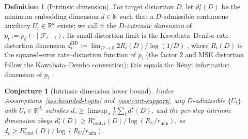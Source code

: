 \documentclass[11pt]{article}
\newcommand{\R}{\mathbb{R}}
\newcommand{\N}{\mathbb{N}}
\newcommand{\F}{\mathcal{F}}
\theoremstyle{plain}
\newtheorem{conjecture}[theorem]{Conjecture}
\theoremstyle{definition}
\newtheorem{definition}[theorem]{Definition}
\theoremstyle{remark}
\begin{document}
\begin{definition}[Intrinsic dimension]\label{def:intrinsic-dim}
For target distortion $D$, let $d^\star_t(D)$ be the minimum
embedding dimension $d \in \N$ such that a $D$-admissible
continuous auxiliary $U_t \in \R^d$ exists; we call it the
\emph{$D$-intrinsic dimension} of $p_t := p_\theta(\cdot \mid
\F_{t-1})$. Its small-distortion limit is the Kawabata--Dembo
rate-distortion dimension
$d^{\mathrm{RD}}_t := \lim_{D \to 0} 2 R_t(D)/\log(1/D)$
\citep{kawabata1994rate}, where $R_t(D)$ is the squared-error
rate--distortion function of $p_t$ (the factor $2$ and MSE
distortion follow the Kawabata--Dembo convention); this equals the
R\'enyi information dimension of $p_t$ \citep{geiger2016rate}.
\end{definition}

\begin{conjecture}[Intrinsic dimension lower bound]
\label{thm:intrinsic-dim}
Under Assumptions~\ref{ass:bounded-logits}
and~\ref{ass:cont-support}, any $D$-admissible $\{U_t\}$ with
$U_t \in \R^{d_c}$ satisfies
$d_c \geq \limsup_n \frac1n\sum_t d^\star_t(D)$, and the per-step
intrinsic dimension obeys
$d^\star_t(D) \geq R^{\star}_{\mathrm{cont},t}(D)/\log(R_U/r_{\min})$,
so $d_c \geq R^\star_{\mathrm{cont}}(D)/\log(R_U/r_{\min})$.
\end{conjecture}
\end{document}
